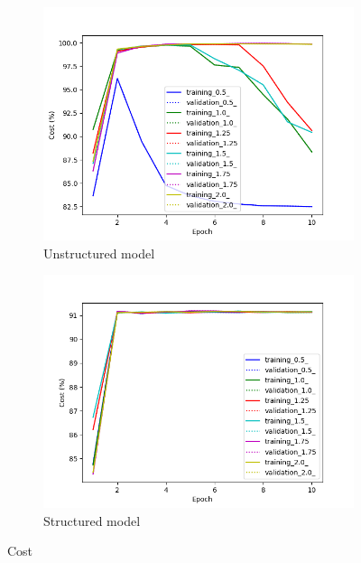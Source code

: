\begin{figure}
    \centering
    \begin{subfigure}[b]{0.47\textwidth}
        \centering
        \includegraphics[width=1.1\textwidth]{figs/unstructured_cost.png}
        \caption{Unstructured model}
        \label{fig:unstr_cost}
    \end{subfigure}
    \hfill
    \begin{subfigure}[b]{0.47\textwidth}
        \centering
        \includegraphics[width=1.1\textwidth]{figs/structured_cost.png}
        \caption{Structured model}
        \label{fig:str_cost}
    \end{subfigure}
    \caption{Cost}
    \label{fig:cost}
\end{figure}

